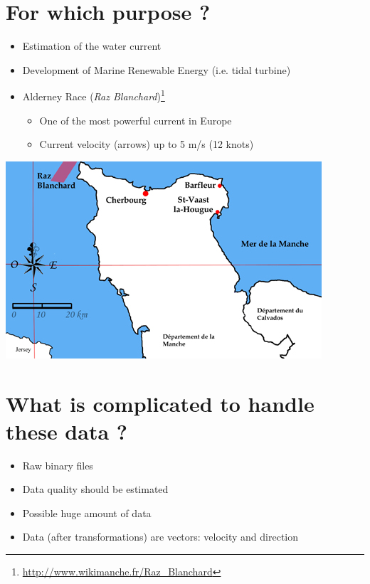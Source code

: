 \documentclass[11pt]{beamer}
\begin{document}
	\section{For which purpose ?}
	\begin{frame}{\secname}
		\begin{itemize}
			\item Estimation of the water current
			\item Development of Marine Renewable Energy (i.e. tidal turbine)
			\item Alderney Race (\textit{Raz Blanchard})\footnote{\url{http://www.wikimanche.fr/Raz_Blanchard}}
				\begin{itemize}
					\item One of the most powerful current in Europe
					\item Current velocity (arrows) up to 5 m/s (12 knots)
				\end{itemize}
		\end{itemize}
		\begin{center}
			\includegraphics[scale=.5]{raz_blanchard}
		\end{center}
	\end{frame}

	\section{What is complicated to handle these data ?}
	\begin{frame}{\secname}
		\begin{itemize}
			\item Raw binary files
			\item Data quality should be estimated
			\item Possible huge amount of data
			\item Data (after transformations) are vectors: velocity and direction
		\end{itemize}
	\end{frame}
\end{document}
